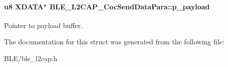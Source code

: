 \paragraph[{\texorpdfstring{p\+\_\+payload}{p_payload}}]{\setlength{\rightskip}{0pt plus 5cm}u8 X\+D\+A\+TA$\ast$ B\+L\+E\+\_\+\+L2\+C\+A\+P\+\_\+\+Coc\+Send\+Data\+Para\+::p\+\_\+payload}\hypertarget{struct_b_l_e___l2_c_a_p___coc_send_data_para_a3ce986c79dd4de08605990d2b0c8875e}{}\label{struct_b_l_e___l2_c_a_p___coc_send_data_para_a3ce986c79dd4de08605990d2b0c8875e}
Pointer to payload buffer. 

The documentation for this struct was generated from the following file\+:\begin{DoxyCompactItemize}
\item 
B\+L\+E/ble\+\_\+l2cap.\+h\end{DoxyCompactItemize}
